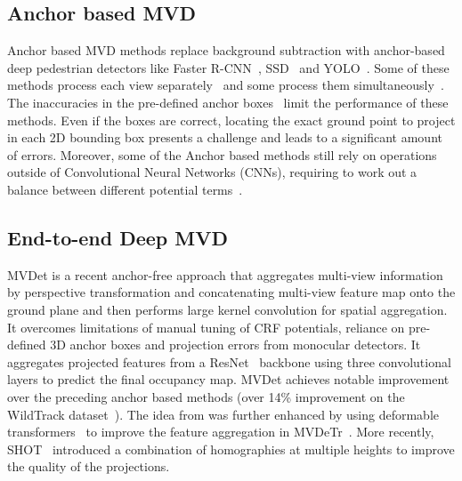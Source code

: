 \documentclass[letterpaper, 10 pt, conference]{ieeeconf}  \usepackage{times}
\newcommand{\wildtrack}{WildTrack }
\begin{document}
\subsection{Anchor based MVD}
Anchor based MVD methods replace background subtraction with anchor-based deep pedestrian detectors like Faster R-CNN~\cite{Ren2015FasterRT}, SSD~\cite{Liu2016SSDSS} and YOLO~\cite{Redmon2016YouOL}. Some of these methods process each view separately~\cite{xu2016multi} and some process them simultaneously~\cite{Baqu2017DeepOR, Chavdarova2017DeepMP}. The inaccuracies in the pre-defined anchor boxes~\cite{kong2020foveabox} limit the performance of these methods. Even if the boxes are correct, locating the exact ground point to project in each 2D bounding box presents a challenge and leads to a significant amount of errors. Moreover, some of the Anchor based methods still rely on operations outside of Convolutional Neural Networks (CNNs), requiring to work out a balance between different potential terms~\cite{Baqu2017DeepOR}.





\subsection{End-to-end Deep MVD}



MVDet \cite{hou2020multiview} is a recent anchor-free approach that aggregates multi-view information by perspective transformation and concatenating multi-view feature map onto the ground plane and then performs large kernel convolution for spatial aggregation. It overcomes limitations of manual tuning of CRF potentials, reliance on pre-defined 3D anchor boxes and projection errors from monocular detectors. It aggregates projected features from a ResNet~\cite{He2016DeepRL} backbone using three convolutional layers to predict the final occupancy map. MVDet achieves notable improvement over the preceding anchor based methods (over 14\% improvement on the \wildtrack dataset~\cite{Chavdarova2018WILDTRACKAM}). The idea from \cite{hou2020multiview} was further enhanced by using deformable transformers~\cite{zhu2020deformable} to improve the feature aggregation in MVDeTr~\cite{hou2021multiview}. More recently, SHOT~\cite{song2021stacked} introduced a combination of homographies at multiple heights to improve the quality of the projections. 
\end{document}
